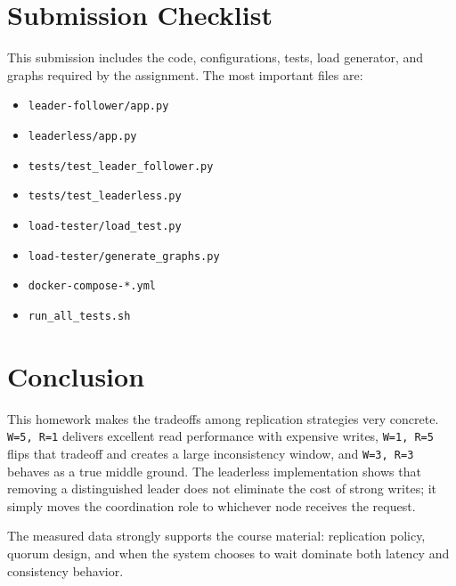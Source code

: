 \documentclass[11pt]{article}
\begin{document}
\section{Submission Checklist}

This submission includes the code, configurations, tests, load generator, and graphs required by the assignment. The most important files are:
\begin{itemize}
\item \texttt{leader-follower/app.py}
\item \texttt{leaderless/app.py}
\item \texttt{tests/test\_leader\_follower.py}
\item \texttt{tests/test\_leaderless.py}
\item \texttt{load-tester/load\_test.py}
\item \texttt{load-tester/generate\_graphs.py}
\item \texttt{docker-compose-*.yml}
\item \texttt{run\_all\_tests.sh}
\end{itemize}

\section{Conclusion}

This homework makes the tradeoffs among replication strategies very concrete. \texttt{W=5, R=1} delivers excellent read performance with expensive writes, \texttt{W=1, R=5} flips that tradeoff and creates a large inconsistency window, and \texttt{W=3, R=3} behaves as a true middle ground. The leaderless implementation shows that removing a distinguished leader does not eliminate the cost of strong writes; it simply moves the coordination role to whichever node receives the request.

The measured data strongly supports the course material: replication policy, quorum design, and when the system chooses to wait dominate both latency and consistency behavior.
\end{document}
